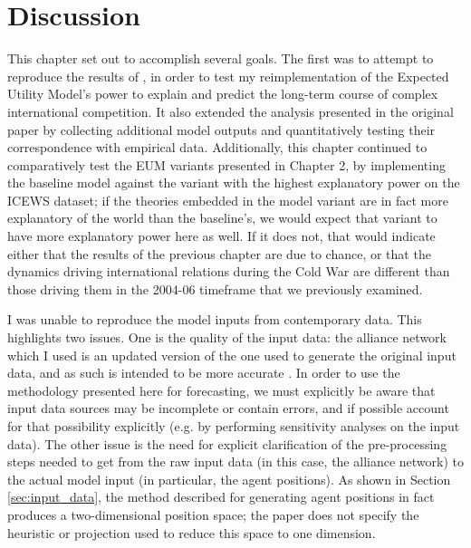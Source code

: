 \section{Discussion} \label{cw_discussion}




This chapter set out to accomplish several goals. The first was to attempt to reproduce the results of \citet{bdm_1998}, in order to test my reimplementation of the Expected Utility Model's power to explain and predict the long-term course of complex international competition. It also extended the analysis presented in the original paper by collecting additional model outputs and quantitatively testing their correspondence with empirical data. Additionally, this chapter continued to comparatively test the EUM variants presented in Chapter 2, by implementing the baseline model against the variant with the highest explanatory power on the ICEWS dataset; if the theories embedded in the model variant are in fact more explanatory of the world than the baseline's, we would expect that variant to have more explanatory power here as well. If it does not, that would indicate either that the results of the previous chapter are due to chance, or that the dynamics driving international relations during the Cold War are different than those driving them in the 2004-06 timeframe that we previously examined.

I was unable to reproduce the model inputs from contemporary data. This highlights two issues. One is the quality of the input data: the alliance network which I used is an updated version of the one used to generate the original input data, and as such is intended to be more accurate \citep{gibler_2013}. In order to use the methodology presented here for forecasting, we must explicitly be aware that input data sources may be incomplete or contain errors, and if possible account for that possibility explicitly (e.g. by performing sensitivity analyses on the input data). The other issue is the need for explicit clarification of the pre-processing steps needed to get from the raw input data (in this case, the alliance network) to the actual model input (in particular, the agent positions). As shown in Section \ref{sec:input_data}, the method described for generating agent positions in fact produces a two-dimensional position space; the paper does not specify the heuristic or projection used to reduce this space to one dimension.

